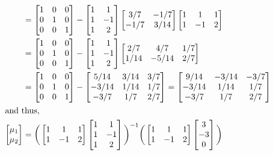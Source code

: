 \begin{example}
\begin{align*}
&= \begin{bmatrix} 1 & 0 & 0 \\ 0 & 1 & 0 \\ 0 & 0 & 1 \end{bmatrix} - \begin{bmatrix} 1 & 1 \\ 1 & -1 \\ 1 & 2 \end{bmatrix} \begin{bmatrix} 3/7 & -1/7 \\ -1/7 & 3/14 \end{bmatrix} \begin{bmatrix} 1 & 1 & 1 \\ 1 & -1 & 2 \end{bmatrix} \\
&= \begin{bmatrix} 1 & 0 & 0 \\ 0 & 1 & 0 \\ 0 & 0 & 1 \end{bmatrix} - \begin{bmatrix} 1 & 1 \\ 1 & -1 \\ 1 & 2 \end{bmatrix} \begin{bmatrix} 2/7 & 4/7 & 1/7 \\ 1/14 & -5/14 & 2/7 \end{bmatrix} \\
&= \begin{bmatrix} 1 & 0 & 0 \\ 0 & 1 & 0 \\ 0 & 0 & 1 \end{bmatrix} - \begin{bmatrix} 5/14 & 3/14 & 3/7 \\ -3/14 & 1/14 & 1/7 \\ -3/7 & 1/7 & 2/7 \end{bmatrix} = \begin{bmatrix} 9/14 & -3/14 & -3/7 \\ -3/14 & 1/14 & 1/7 \\ -3/7 & 1/7 & 2/7 \end{bmatrix} \\
\intertext{and thus,}
\begin{bmatrix} \mu_1 \\ \mu_2 \end{bmatrix} &= \bigg( \begin{bmatrix} 1 & 1 & 1 \\ 1 & -1 & 2 \end{bmatrix} \begin{bmatrix} 1 & 1 \\ 1 & -1 \\ 1 & 2 \end{bmatrix} \bigg)^{-1} \bigg( \begin{bmatrix} 1 & 1 & 1 \\ 1 & -1 & 2 \end{bmatrix} \begin{bmatrix} 3 \\ -3 \\ 0 \end{bmatrix} \bigg) \\

\end{align*}
\end{example}
